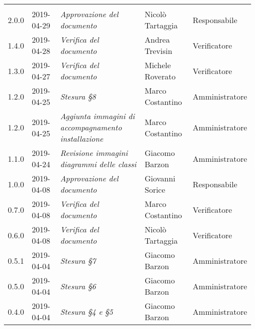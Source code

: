 \newpage 
\section*{}
\begin{longtable}{C{2cm}|C{2.5cm}|C{4.5cm}|C{2.5cm}|C{3cm}}
	
	 &  &  &  &   \\
	\endhead
	
	2.0.0 & 2019-04-29 &  \emph{Approvazione del documento} & Nicolò Tartaggia & Responsabile \\
	\hline
	
	1.4.0 & 2019-04-28 &  \emph{Verifica del documento} & Andrea Trevisin & Verificatore \\
	\hline
	
	1.3.0 & 2019-04-27 &  \emph{Verifica del documento} & Michele Roverato & Verificatore \\
	\hline
	
	1.2.0 & 2019-04-25 &  \emph{Stesura §8} & Marco Costantino & Amministratore \\
	\hline
	
	1.2.0 & 2019-04-25 &  \emph{Aggiunta immagini di accompagnamento installazione} & Marco Costantino & Amministratore \\
	\hline
	
	1.1.0 & 2019-04-24 &  \emph{Revisione immagini diagrammi delle classi} & Giacomo Barzon & Amministratore \\
	\hline
	
	1.0.0 & 2019-04-08 &  \emph{Approvazione del documento} & Giovanni Sorice  & Responsabile\\
	\hline
	
	0.7.0 & 2019-04-08 & \emph{Verifica del documento} & Marco Costantino & Verificatore \\
	\hline
	
	0.6.0 & 2019-04-08 & \emph{Verifica del documento} & Nicolò Tartaggia & Verificatore \\
	\hline
	
	0.5.1 & 2019-04-04 & \emph{Stesura §7} & Giacomo Barzon & Amministratore \\
	\hline
	
	0.5.0 & 2019-04-04 & \emph{Stesura §6} & Giacomo Barzon & Amministratore \\
	\hline
	
	0.4.0 & 2019-04-04 & \emph{Stesura §4 e §5} & Giacomo Barzon & Amministratore \\
	\hline
	

\end{longtable}
